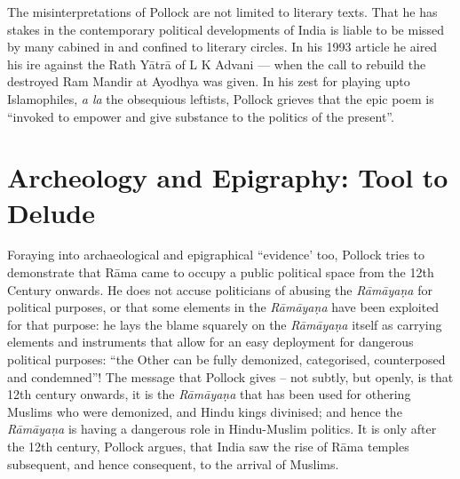 The misinterpretations of Pollock are not limited to literary texts. That he has stakes in the contemporary political developments of India is liable to be missed by many cabined in and confined to literary circles. In his 1993 article he aired his ire against the Rath Yātrā of L K Advani --- when the call to rebuild the destroyed Ram Mandir at Ayodhya was given. In his zest for playing upto Islamophiles, {\sl a la} the obsequious leftists, Pollock grieves that the epic poem is “invoked to empower and give substance to the politics of the present”.

\section*{Archeology and Epigraphy: Tool to Delude}

Foraying into archaeological and epigraphical “evidence’ too, Pollock tries to demonstrate that Rāma came to occupy a public political space from the 12th Century onwards. He does not accuse politicians of abusing the {\sl Rāmāyaṇa} for political purposes, or that some elements in the {\sl Rāmāyaṇa} have been exploited for that purpose: he lays the blame squarely on the {\sl Rāmāyaṇa} itself as carrying elements and instruments that allow for an easy deployment for dangerous political purposes: “the Other can be fully demonized, categorised, counterposed and condemned”! The message that Pollock gives -- not subtly, but openly, is that 12th century onwards, it is the {\sl Rāmāyaṇa} that has been used for othering Muslims who were demonized, and Hindu kings divinised; and hence the {\sl Rāmāyaṇa} is having a dangerous role in Hindu-Muslim politics. It is only after the 12th century, Pollock argues, that India saw the rise of Rāma temples subsequent, and hence consequent, to the arrival of Muslims.

